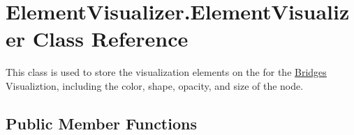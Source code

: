 \hypertarget{class_element_visualizer_1_1_element_visualizer}{}\section{Element\+Visualizer.\+Element\+Visualizer Class Reference}
\label{class_element_visualizer_1_1_element_visualizer}


This class is used to store the visualization elements on the for the \hyperlink{namespace_bridges}{Bridges} Visualiztion, including the color, shape, opacity, and size of the node.  


\subsection*{Public Member Functions}
